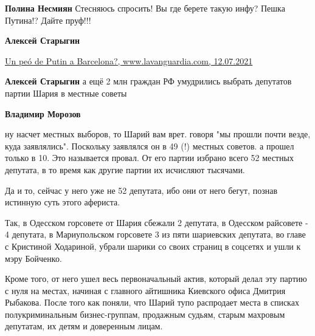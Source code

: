 \begin{itemize}
\begin{itemize}
\textbf{Полина Несмиян} Стесняюсь спросить! Вы где берете такую инфу? Пешка Путина!? Дайте пруф!!!

 
\textbf{Алексей Старыгин} 

\href{www.lavanguardia.com/encatala/20210712/7593717/peo-putin-barcelona.html}{%
Un peó de Putin a Barcelona?, www.lavanguardia.com, 12.07.2021%
}

 
\textbf{Алексей Старыгин} а ещё 2 млн граждан РФ умудрились выбрать депутатов партии Шария в местные советы

 
\textbf{Владимир Морозов} 

ну насчет местных выборов, то Шарий вам врет. говоря "мы прошли почти везде,
куда заявлялись". Поскольку заявлялся он в 49 (!) местных советов. а прошел
только в 10. Это называется провал. От его партии избрано всего 52 местных
депутата, в то время как другие партии их исчисляют тысячами. 

Да и то, сейчас у него уже не 52 депутата, ибо они от него бегут, познав
истинную суть этого афериста. 

Так, в Одесском горсовете от Шария сбежали 2 депутата, в Одесском райсовете - 4
депутата, в Мариупольском горсовете 3 из пяти шариевских депутата, во главе с
Кристиной Ходариной, убрали шарики со своих страниц в соцсетях и ушли к мэру
Бойченко. 

Кроме того, от него ушел весь первоначальный актив, который делал эту партию с
нуля на местах, начиная с главного айтишника Киевского офиса Дмитрия Рыбакова.
После того как поняли, что Шарий тупо распродает места в списках
полукриминальным бизнес-группам, продажным судьям, старым махровым депутатам,
их детям и доверенным лицам.


\end{itemize}


\end{itemize}
